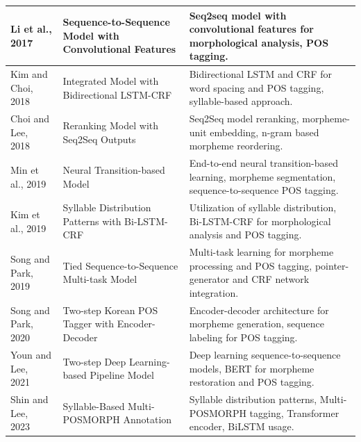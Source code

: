 \documentclass[AMS,STIX2COL]{WileyNJD-v2}
\begin{document}
\begin{table}[h!]
\begin{tabular}{|p{10mm}|p{24mm}|p{40mm}|}
            \hline
            Li et al., 2017~\cite{Li2017}         & Sequence-to-Sequence Model with Convolutional Features & Seq2seq model with convolutional features for morphological analysis, POS tagging.                                \\
            \hline
            Kim and Choi, 2018~\cite{KimSW2018}   & Integrated Model with Bidirectional LSTM-CRF           & Bidirectional LSTM and CRF for word spacing and POS tagging, syllable-based approach.                             \\
            \hline
            Choi and Lee, 2018~\cite{ChoiYS2018}  & Reranking Model with Seq2Seq Outputs                   & Seq2Seq model reranking, morpheme-unit embedding, n-gram based morpheme reordering.                               \\
            \hline
            Min et al., 2019~\cite{MinJW2019}     & Neural Transition-based Model                          & End-to-end neural transition-based learning, morpheme segmentation, sequence-to-sequence POS tagging.             \\
            \hline
            Kim et al., 2019~\cite{KimHM2019}     & Syllable Distribution Patterns with Bi-LSTM-CRF        & Utilization of syllable distribution, Bi-LSTM-CRF for morphological analysis and POS tagging.                     \\
            \hline
            Song and Park, 2019~\cite{SongHJ2019} & Tied Sequence-to-Sequence Multi-task Model             & Multi-task learning for morpheme processing and POS tagging, pointer-generator and CRF network integration.       \\
            \hline
            Song and Park, 2020~\cite{SongHJ2020} & Two-step Korean POS Tagger with Encoder-Decoder        & Encoder-decoder architecture for morpheme generation, sequence labeling for POS tagging.                          \\
            \hline
            Youn and Lee, 2021~\cite{YounJY2021}  & Two-step Deep Learning-based Pipeline Model            & Deep learning sequence-to-sequence models, BERT for morpheme restoration and POS tagging.                         \\
            \hline
            Shin and Lee, 2023~\cite{ShinHJ2023}  & Syllable-Based Multi-POSMORPH Annotation               & Syllable distribution patterns, Multi-POSMORPH tagging, Transformer encoder, BiLSTM usage.                        \\
            \hline
        \end{tabular}
    \end{table}
\end{document}
